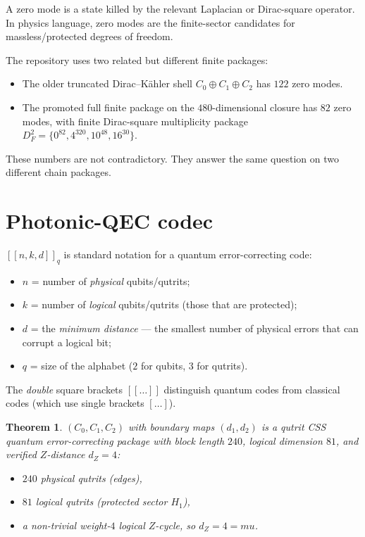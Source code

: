 \documentclass[11pt]{article}
\def\textbf#1{#1}%
\def\mu{mu}%
\newtheorem*{theorem}{Theorem}
\begin{document}
\begin{statusbox}[title=Which zero modes?]
A \textbf{zero mode} is a state killed by the relevant Laplacian or Dirac-square operator. In physics language, zero modes are the finite-sector candidates for massless/protected degrees of freedom.

The repository uses two related but different finite packages:
\begin{itemize}[leftmargin=2em]
\item The older truncated Dirac--Kähler shell $C_0\oplus C_1\oplus C_2$ has $122$ zero modes.
\item The promoted full finite package on the $480$-dimensional closure has $82$ zero modes, with finite Dirac-square multiplicity package $D_F^2=\{0^{82},4^{320},10^{48},16^{30}\}$.
\end{itemize}
These numbers are not contradictory. They answer the same question on two different chain packages.
\end{statusbox}

\section{Photonic-QEC codec}

\begin{mathnote}
$[[n, k, d]]_q$ is standard notation for a \textbf{quantum error-correcting code}:
\begin{itemize}[leftmargin=2em]
\item $n$ = number of \emph{physical} qubits/qutrits;
\item $k$ = number of \emph{logical} qubits/qutrits (those that are protected);
\item $d$ = the \emph{minimum distance} --- the smallest number of physical errors that can corrupt a logical bit;
\item $q$ = size of the alphabet ($2$ for qubits, $3$ for qutrits).
\end{itemize}

The \emph{double} square brackets $[[\ldots]]$ distinguish quantum codes from classical codes (which use single brackets $[\ldots]$).
\end{mathnote}

\begin{theorem}
$(C_0, C_1, C_2)$ with boundary maps $(d_1, d_2)$ is a qutrit CSS quantum error-correcting package with block length $240$, logical dimension $81$, and verified $Z$-distance $d_Z = 4$:
\begin{itemize}[leftmargin=2em]
\item $240$ physical qutrits (edges),
\item $81$ logical qutrits (protected sector $H_1$),
\item a non-trivial weight-$4$ logical $Z$-cycle, so $d_Z = 4 = \mu$.
\end{itemize}
\end{theorem}
\end{document}
